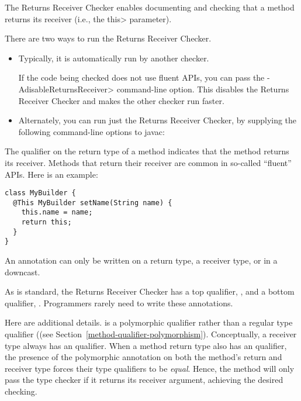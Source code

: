 \htmlhr
{}

The Returns Receiver Checker enables documenting and checking that a method
returns its receiver (i.e., the \<this> parameter).

There are two ways to run the Returns Receiver Checker.
\begin{itemize}
\item
  Typically, it is automatically run by another checker.

  If the code being checked does not use fluent APIs, you can pass the
  \<-AdisableReturnsReceiver> command-line option.  This disables the
  Returns Receiver Checker and makes the other checker run faster.
\item
Alternately, you can run just the Returns Receiver Checker, by
supplying the following command-line options to javac:
\end{itemize}



The qualifier  on the return
type of a method indicates that the method returns its receiver.  Methods
that return their receiver are common in so-called ``fluent'' APIs.  Here
is an example:

\begin{Verbatim}
class MyBuilder {
  @This MyBuilder setName(String name) {
    this.name = name;
    return this;
  }
}
\end{Verbatim}

An  annotation can only be
written on a return type, a receiver type, or in a downcast.

As is standard, the Returns Receiver Checker has a top qualifier,
, and a bottom qualifier,
.
Programmers rarely need to write these annotations.

Here are additional details.  
is a polymorphic qualifier rather than a regular type qualifier ((see
Section~\ref{method-qualifier-polymorphism}). Conceptually, a receiver type always has
an  qualifier. When a method
return type also has an 
qualifier, the presence of the polymorphic annotation on both the method's
return and receiver type forces their type qualifiers to be \emph{equal}. Hence,
the method will only pass the type checker if it returns its receiver argument,
achieving the desired checking.


